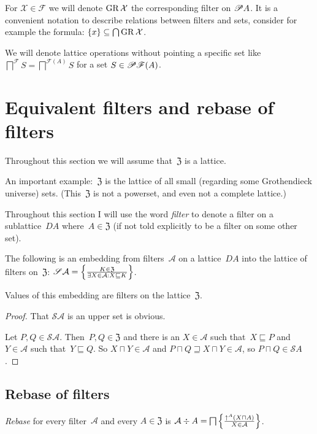 For $\mathcal{X}\in\mathscr{F}$ we will denote $\operatorname{GR}\mathcal{X}$
the corresponding filter on $\mathscr{P} A$. It is a convenient notation
to describe relations between filters and sets, consider for example
the formula: $\{x\}\subseteq\bigcap\operatorname{GR}\mathcal{X}$.

We will denote lattice operations without pointing a specific set
like $\bigsqcap^{\mathscr{F}}S=\bigsqcap^{\mathscr{F}(A)}S$ for a
set $S\in\mathscr{P}\mathscr{F}(A)$.

\section{Equivalent filters and rebase of filters}

Throughout this section we will assume that~$\mathfrak{Z}$
is a lattice.

An important example:~$\mathfrak{Z}$ is the lattice of
all small (regarding some Grothendieck universe) sets.
(This~$\mathfrak{Z}$ is not
a powerset, and even not a complete lattice.)

Throughout this section I will use the word \emph{filter}
to denote a filter on a sublattice~$DA$
where~$A\in\mathfrak{Z}$ (if not told explicitly to be a
filter on some other set).

The following is an embedding from
filters~$\mathcal{A}$ on a lattice~$DA$ into the lattice of
filters on~$\mathfrak{Z}$:
$\mathscr{S}\mathcal{A}=\left\{ \frac{K\in\mathfrak{Z}}{
\exists X\in\mathcal{A}:X\sqsubseteq K}\right\}$.

\begin{prop}
Values of this embedding are filters on the
lattice~$\mathfrak{Z}$.
\end{prop}

\begin{proof}
That $\mathscr{S}\mathcal{A}$ is an upper set is obvious.

Let $P,Q\in\mathscr{S}\mathcal{A}$.
Then~$P,Q\in\mathfrak{Z}$ and there is an $X\in\mathcal{A}$
such that~$X\sqsubseteq P$ and $Y\in\mathcal{A}$ such
that~$Y\sqsubseteq Q$. So $X\sqcap Y\in\mathcal{A}$
and $P\sqcap Q\sqsupseteq X\sqcap Y\in\mathcal{A}$, so
$P\sqcap Q\in\mathscr{S}A$.
\end{proof}

\subsection{Rebase of filters}

\begin{defn}
\emph{Rebase} for every
filter~$\mathcal{A}$
and every $A\in\mathfrak{Z}$ is
  $\mathcal{A} \div A = \bigsqcap \left\{ \frac{ \uparrow^A  (X \sqcap A) }{ X \in \mathcal{A} }\right\}$.
\end{defn}

